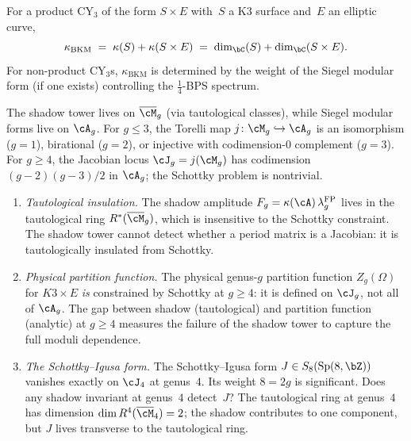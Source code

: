 \begin{conjecture}
\label{conj:kappa-bps-universality}
\ClaimStatusConjectured\quad
For a product CY$_3$ of the form $S \times E$ with~$S$ a K3
surface and~$E$ an elliptic curve,
\[
\kappa_{\mathrm{BKM}}
\;=\;
\kappa(S) + \kappa(S \times E)
\;=\;
\dim_\bC(S) + \dim_\bC(S \times E).
\]
For non-product CY$_3$s, $\kappa_{\mathrm{BKM}}$ is
determined by the weight of the Siegel modular form
\textup{(}if one exists\textup{)} controlling the
$\frac{1}{4}$-BPS spectrum.
\end{conjecture}



\begin{openproblem}
\label{op:programme-d-schottky}
The shadow tower lives on $\overline{\cM}_g$
(via tautological classes), while Siegel modular forms
live on $\cA_g$. For $g \leq 3$, the Torelli map
$j \colon \cM_g \hookrightarrow \cA_g$ is an
isomorphism ($g = 1$), birational ($g = 2$), or
injective with codimension-$0$ complement ($g = 3$).
For $g \geq 4$, the Jacobian locus $\cJ_g = j(\cM_g)$
has codimension $(g-2)(g-3)/2$ in $\cA_g$; the
Schottky problem is nontrivial.
\begin{enumerate}[label=\textup{(D\arabic*)}]
\item \emph{Tautological insulation.} The shadow amplitude
 $F_g = \kappa(\cA)\,\lambda_g^{\mathrm{FP}}$ lives in the
 tautological ring $R^*(\overline{\cM}_g)$, which is
 insensitive to the Schottky constraint. The shadow
 tower cannot detect whether a period matrix is a
 Jacobian: it is tautologically insulated from Schottky.
\item \emph{Physical partition function.}
 The physical genus-$g$ partition function
 $Z_g(\Omega)$ for $K3 \times E$ \emph{is} constrained
 by Schottky at $g \geq 4$: it is defined on $\cJ_g$,
 not all of $\cA_g$. The gap between shadow
 (tautological) and partition function (analytic)
 at $g \geq 4$ measures the failure of the shadow tower
 to capture the full moduli dependence.
\item \emph{The Schottky--Igusa form.} The Schottky--Igusa
 form $J \in S_8(\operatorname{Sp}(8,\bZ))$ vanishes
 exactly on $\cJ_4$ at genus~$4$. Its weight $8 = 2g$
 is significant. Does any shadow invariant at genus~$4$
 detect~$J$? The tautological ring at genus~$4$ has
 dimension $\dim R^4(\overline{\cM}_4) = 2$; the shadow
 contributes to one component, but $J$ lives transverse
 to the tautological ring.
\end{enumerate}
\end{openproblem}

